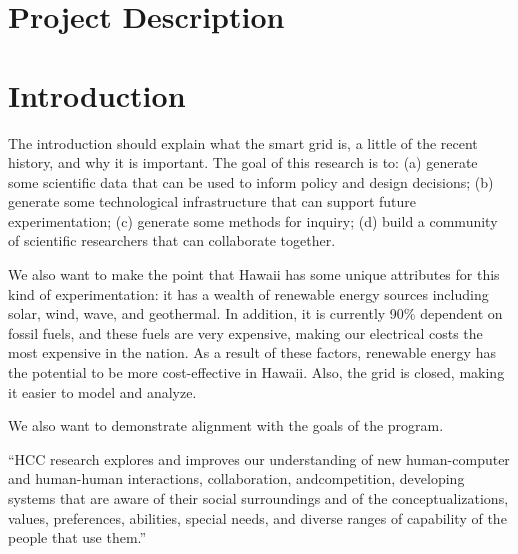 
\renewcommand{\thepage} {C--\arabic{page}}

\renewcommand{\thesection} {C.\arabic{section}}
\setcounter{section}{0}

\section{Project Description}

\section{Introduction}

The introduction should explain what the smart grid is, a little of the recent history, and why it is important. The goal of this research is to: (a) generate some scientific data that can be used to inform policy and design decisions; (b) generate some technological infrastructure that can support future experimentation; (c) generate some methods for inquiry; (d) build a community of scientific researchers that can collaborate together.

We also want to make the point that Hawaii has some unique attributes for this kind of experimentation: it has a wealth of renewable energy sources including solar, wind, wave, and geothermal.  In addition, it is currently 90\% dependent on fossil fuels, and these fuels are very expensive, making our electrical costs the most expensive in the nation.  As a result of these factors, renewable energy has the potential to be more cost-effective in Hawaii.  Also, the grid is closed, making it easier to model and analyze. 

We also want to demonstrate alignment with the goals of the program.

``HCC research explores and improves our understanding of new
human-computer and human-human interactions, collaboration, andcompetition, developing systems that are aware of their social surroundings
and of the conceptualizations, values, preferences, abilities, special
needs, and diverse ranges of capability of the people that use them.''

